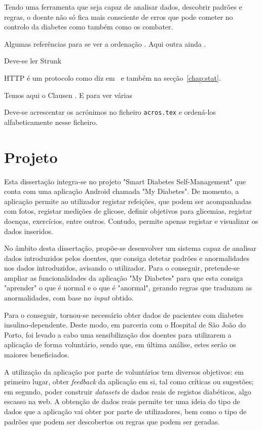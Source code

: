 Tendo uma ferramenta que seja capaz de analisar dados, descobrir padrões e regras, o doente não só fica mais consciente de erros que pode cometer no controlo da diabetes como também como os combater. 

Algumas referências para se ver a ordenação  \cite{yaacoub2012}. Aqui outra ainda \cite{etsitr102732}.

Deve-se ler Strunk~\cite{strunk2007elements}

\ac{HTTP} é um protocolo como diz em~\cite{test2000} e também na secção~\ref{chap:stat}.

  Temos aqui o Clausen \cite{Clausen2003}. E para ver várias \cite{yaacoub2012, etsitr102732, strunk2007elements}

Deve-se acrescentar os acrónimos no ficheiro \texttt{acros.tex} e ordená-los alfabeticamente nesse ficheiro.


\section{Projeto}

Esta dissertação integra-se no projeto "Smart Diabetes Self-Management" que conta com uma aplicação Android chamada "My Diabetes". De momento, a aplicação permite ao utilizador registar refeições, que podem ser acompanhadas com fotos, registar medições de glicose, definir objetivos para glicemias, registar doenças, exercícios, entre outros. Contudo, permite apenas registar e visualizar os dados inseridos.

No âmbito desta dissertação, propõe-se desenvolver um sistema capaz de analisar dados introduzidos pelos doentes, que consiga detetar padrões e anormalidades nos dados introduzidos, avisando o utilizador. Para o conseguir, pretende-se ampliar as funcionalidades da aplicação "My Diabetes" para que esta consiga "aprender" o que é normal e o que é "anormal", gerando regras que traduzam as anormalidades, com base no \textit{input} obtido.

Para o conseguir, tornou-se necessário obter dados de pacientes com diabetes insulino-dependente. Deste modo, em parceria com o Hospital de São João do Porto, foi levado a cabo uma sensibilização dos doentes para utilizarem a aplicação de forma voluntário, sendo que, em última análise, estes serão os maiores beneficiados.

A utilização da aplicação por parte de voluntários tem diversos objetivos: em primeiro lugar, obter \textit{feedback} da aplicação em si, tal como críticas ou sugestões; em segundo, poder construir \textit{datasets} de dados reais de registos diabéticos, algo escasso na web. A obtenção de dados reais permite ter uma ideia do tipo de dados que a aplicação vai obter por parte de utilizadores, bem como o tipo de padrões que podem ser descobertos ou regras que podem ser geradas.

